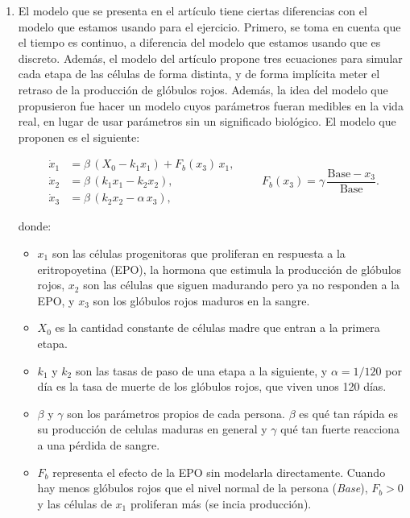 \begin{solucion}
\begin{enumerate}
  Algunos cambios que trae este nuevo modelo son que ahora, necesitamos tener $k+1$ condiciones iniciales. También debido a que la cantidad
  producida de glóbulos rojos va retrasada por $k$ días, el equilibrio al que se llega es más inestable debido a la tardía respuesta del
  cuerpo a la cantidad de glóbulos rojos que hay en el cuerpo previo al cálculo para hacer más.

  \item El modelo que se presenta en el artículo tiene ciertas diferencias con el modelo que estamos usando para el ejercicio. Primero, se
  toma en cuenta que el tiempo es continuo, a diferencia del modelo que estamos usando que es discreto. Además, el modelo del artículo
  propone tres ecuaciones para simular cada etapa de las células de forma distinta, y de forma implícita meter el retraso de la producción
  de glóbulos rojos. Además, la idea del modelo que propusieron fue hacer un modelo cuyos parámetros fueran medibles en la vida real,
  en lugar de usar parámetros sin un significado biológico. El modelo que proponen es el siguiente:

  \[
    \begin{aligned}
      \dot x_1 &= \beta\,(X_0 - k_1 x_1) + F_b(x_3)\,x_1, \\
      \dot x_2 &= \beta\,(k_1 x_1 - k_2 x_2), \\
      \dot x_3 &= \beta\,(k_2 x_2 - \alpha\,x_3),
    \end{aligned}
    \qquad
    F_b(x_3) = \gamma\,\frac{\text{Base} - x_3}{\text{Base}}.
  \]

  donde:
  \begin{itemize}
    \item $x_1$ son las células progenitoras que proliferan en respuesta a la eritropoyetina (EPO),
      la hormona que estimula la producción de glóbulos rojos, $x_2$ son las células que siguen
      madurando pero ya no responden a la EPO, y $x_3$ son los glóbulos rojos maduros en la sangre.
    \item $X_0$ es la cantidad constante de células madre que entran a la primera etapa.
    \item $k_1$ y $k_2$ son las tasas de paso de una etapa a la siguiente, y $\alpha = 1/120$ por día 
      es la tasa de muerte de los glóbulos rojos, que viven unos 120 días.
    \item $\beta$ y $\gamma$ son los parámetros propios de cada persona. $\beta$ es qué tan rápida es
      su producción de celulas maduras en general y $\gamma$ qué tan fuerte reacciona a una pérdida de sangre.
    \item $F_b$ representa el efecto de la EPO sin modelarla directamente. Cuando hay menos glóbulos rojos
      que el nivel normal de la persona (\emph{Base}), $F_b > 0$ y las células de $x_1$ proliferan más (se incia producción).
  \end{itemize}


\end{enumerate}
\end{solucion}
